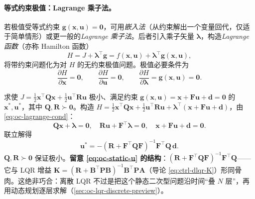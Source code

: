 \paragraph{等式约束极值：Lagrange 乘子法。}
若极值受等式约束 $\mathbf{g}(\mathbf{x},\mathbf{u})=\mathbf{0}$，可用\emph{嵌入法}（从约束解出一个变量回代，仅适于简单情形）或更一般的\emph{Lagrange 乘子法}\cite{liubao2006modern}。后者引入乘子矢量 $\boldsymbol\lambda$，构造\emph{Lagrange 函数}（亦称 Hamilton 函数）
\begin{equation}
  H=J+\boldsymbol\lambda^\top\mathbf{g}=f(\mathbf{x},\mathbf{u})+\boldsymbol\lambda^\top\mathbf{g}(\mathbf{x},\mathbf{u}),
  \label{eq:oc-lagrangian}
\end{equation}
将带约束问题化为对 $H$ 的无约束极值问题。极值必要条件为
\begin{equation}
  \frac{\partial H}{\partial\mathbf{x}}=\mathbf{0},\qquad\frac{\partial H}{\partial\mathbf{u}}=\mathbf{0},\qquad\frac{\partial H}{\partial\boldsymbol\lambda}=\mathbf{g}(\mathbf{x},\mathbf{u})=\mathbf{0}.
  \label{eq:oc-lagrange-cond}
\end{equation}

\begin{example}\label{ex:oc-static-lagrange}
求使 $J=\tfrac12\mathbf{x}^\top\mathbf{Q}\mathbf{x}+\tfrac12\mathbf{u}^\top\mathbf{R}\mathbf{u}$ 极小、满足约束 $\mathbf{g}(\mathbf{x},\mathbf{u})=\mathbf{x}+\mathbf{F}\mathbf{u}+\mathbf{d}=\mathbf{0}$ 的 $\mathbf{x}^*,\mathbf{u}^*$，其中 $\mathbf{Q},\mathbf{R}\succ\mathbf{0}$。构造 $H=\tfrac12\mathbf{x}^\top\mathbf{Q}\mathbf{x}+\tfrac12\mathbf{u}^\top\mathbf{R}\mathbf{u}+\boldsymbol\lambda^\top(\mathbf{x}+\mathbf{F}\mathbf{u}+\mathbf{d})$，由 \cref{eq:oc-lagrange-cond}：
\[
  \mathbf{Q}\mathbf{x}+\boldsymbol\lambda=\mathbf{0},\quad\mathbf{R}\mathbf{u}+\mathbf{F}^\top\boldsymbol\lambda=\mathbf{0},\quad\mathbf{x}+\mathbf{F}\mathbf{u}+\mathbf{d}=\mathbf{0}.
\]
联立解得
\begin{equation}
  \mathbf{u}^*=-(\mathbf{R}+\mathbf{F}^\top\mathbf{Q}\mathbf{F})^{-1}\mathbf{F}^\top\mathbf{Q}\,\mathbf{d}.
  \label{eq:oc-static-u}
\end{equation}
$\mathbf{Q},\mathbf{R}\succ\mathbf{0}$ 保证极小。\textbf{留意 \cref{eq:oc-static-u} 的结构}：$(\mathbf{R}+\mathbf{F}^\top\mathbf{Q}\mathbf{F})^{-1}\mathbf{F}^\top\mathbf{Q}$——它与 LQR 增益 $\mathbf{K}=(\mathbf{R}+\mathbf{B}^\top\mathbf{P}\mathbf{B})^{-1}\mathbf{B}^\top\mathbf{P}\mathbf{A}$（导论 \cref{eq:ctrl-dlqr-K}）形同骨肉。这绝非巧合：离散 LQR 不过是把这个静态二次型问题沿时间“叠 $N$ 层”，再用动态规划逐层求解（\cref{sec:oc-lqr-discrete-preview}）。
\end{example}

